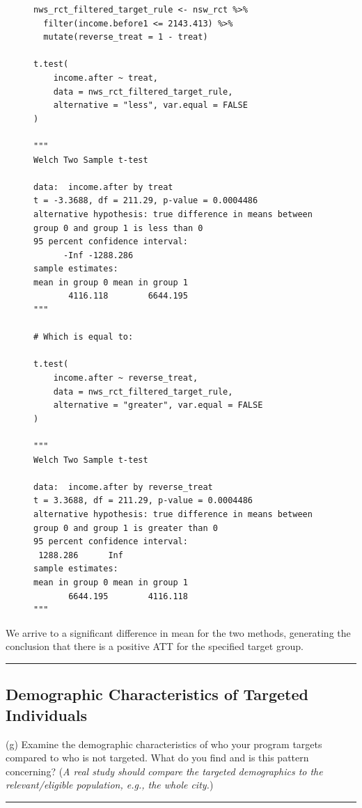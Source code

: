 \documentclass{article}
\newenvironment{colorparagraph}[1]{\par\color{#1}}{\par}
\begin{document}
\begin{figure}[H]
\centering
\begin{lstlisting}[style=Rstyle, caption=Test of Difference in Means]
nws_rct_filtered_target_rule <- nsw_rct %>% 
  filter(income.before1 <= 2143.413) %>% 
  mutate(reverse_treat = 1 - treat)

t.test(
    income.after ~ treat,
    data = nws_rct_filtered_target_rule,
    alternative = "less", var.equal = FALSE
)

"""
Welch Two Sample t-test

data:  income.after by treat
t = -3.3688, df = 211.29, p-value = 0.0004486
alternative hypothesis: true difference in means between group 0 and group 1 is less than 0
95 percent confidence interval:
      -Inf -1288.286
sample estimates:
mean in group 0 mean in group 1 
       4116.118        6644.195 
"""

# Which is equal to:

t.test(
    income.after ~ reverse_treat,
    data = nws_rct_filtered_target_rule,
    alternative = "greater", var.equal = FALSE
)

"""
Welch Two Sample t-test

data:  income.after by reverse_treat
t = 3.3688, df = 211.29, p-value = 0.0004486
alternative hypothesis: true difference in means between group 0 and group 1 is greater than 0
95 percent confidence interval:
 1288.286      Inf
sample estimates:
mean in group 0 mean in group 1 
       6644.195        4116.118 
"""
\end{lstlisting}
\end{figure}

We arrive to a significant difference in mean for the two methods, generating the conclusion that there is a positive ATT for the specified target group.

\begin{colorparagraph}{questioncolor}
\rule{\textwidth}{0.5pt}

\label{q4g}\subsection{Demographic Characteristics of Targeted Individuals}
(g) Examine the demographic characteristics of who your program targets compared to who is not targeted. What do you find and is this pattern concerning? (\textit{A real study should compare the targeted demographics to the relevant/eligible population, e.g., the whole city.})

\rule{\textwidth}{0.5pt}
\end{colorparagraph}
\end{document}
